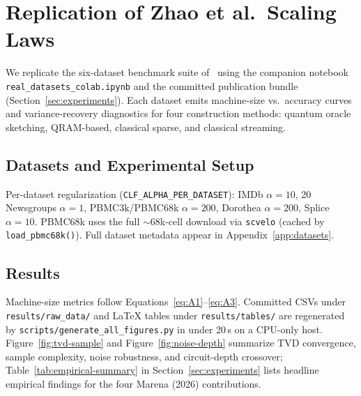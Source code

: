 \section{Replication of Zhao et al.\ Scaling Laws}
\label{sec:core}

We replicate the six-dataset benchmark suite of \Zhao\ using the companion notebook \texttt{real\_datasets\_colab.ipynb} and the committed publication bundle (Section~\ref{sec:experiments}).  Each dataset emits machine-size vs.\ accuracy curves and variance-recovery diagnostics for four construction methods: quantum oracle sketching, QRAM-based, classical sparse, and classical streaming.

\subsection{Datasets and Experimental Setup}

Per-dataset regularization (\texttt{CLF\_ALPHA\_PER\_DATASET}): IMDb $\alpha=10$, 20 Newsgroups $\alpha=1$, PBMC3k/PBMC68k $\alpha=200$, Dorothea $\alpha=200$, Splice $\alpha=10$.  PBMC68k uses the full $\sim$68k-cell download via \texttt{scvelo} (cached by \texttt{load\_pbmc68k()}).  Full dataset metadata appear in Appendix~\ref{app:datasets}.

\subsection{Results}

Machine-size metrics follow Equations~\eqref{eq:A1}--\eqref{eq:A3}.  Committed CSVs under \texttt{results/raw\_data/} and LaTeX tables under \texttt{results/tables/} are regenerated by \texttt{scripts/generate\_all\_figures.py} in under 20\,s on a CPU-only host.  Figure~\ref{fig:tvd-sample} and Figure~\ref{fig:noise-depth} summarize TVD convergence, sample complexity, noise robustness, and circuit-depth crossover; Table~\ref{tab:empirical-summary} in Section~\ref{sec:experiments} lists headline empirical findings for the four Marena (2026) contributions.
